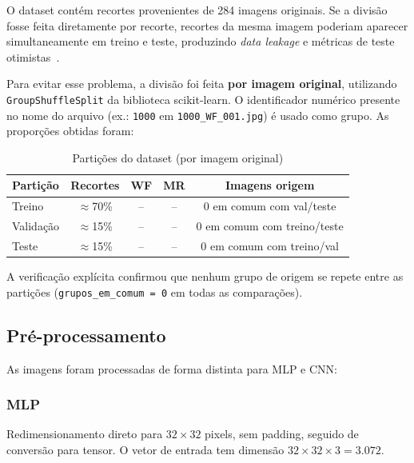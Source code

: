 \documentclass[conference]{IEEEtran}
\begin{document}
O dataset contém recortes provenientes de 284 imagens originais.
Se a divisão fosse feita diretamente por recorte, recortes da mesma
imagem poderiam aparecer simultaneamente em treino e teste, produzindo
\textit{data leakage} e métricas de teste otimistas~\cite{barbedo2014}.

Para evitar esse problema, a divisão foi feita \textbf{por imagem original},
utilizando \texttt{GroupShuffleSplit} da biblioteca scikit-learn.
O identificador numérico presente no nome do arquivo (ex.: \texttt{1000}
em \texttt{1000\_WF\_001.jpg}) é usado como grupo. As proporções obtidas foram:

\begin{table}[H]
\centering
\caption{Partições do dataset (por imagem original)}
\label{tab:split}
\footnotesize
\begin{tabularx}{\columnwidth}{lcccc}
\toprule
\textbf{Partição} & \textbf{Recortes} & \textbf{WF} & \textbf{MR} &
\textbf{Imagens origem} \\
\midrule
Treino    & $\approx$70\% & -- & -- & 0 em comum com val/teste \\
Validação & $\approx$15\% & -- & -- & 0 em comum com treino/teste \\
Teste     & $\approx$15\% & -- & -- & 0 em comum com treino/val \\
\bottomrule
\end{tabularx}
\end{table}

A verificação explícita confirmou que nenhum grupo de origem se repete
entre as partições (\texttt{grupos\_em\_comum = 0} em todas as
comparações).

\subsection{Pré-processamento}

As imagens foram processadas de forma distinta para MLP e CNN:

\subsubsection{MLP}
Redimensionamento direto para $32 \times 32$ pixels, sem padding,
seguido de conversão para tensor. O vetor de entrada tem dimensão
$32 \times 32 \times 3 = 3.072$.
\end{document}
